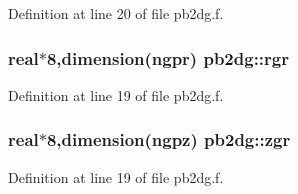 Definition at line 20 of file pb2dg.f.\hypertarget{namespacepb2dg_5018cdbf4ff81bb02ec25414689c7987}{
\subsubsection[rgr]{\setlength{\rightskip}{0pt plus 5cm}real$\ast$8,dimension(ngpr) {\bf pb2dg::rgr}}}
\label{namespacepb2dg_5018cdbf4ff81bb02ec25414689c7987}




Definition at line 19 of file pb2dg.f.\hypertarget{namespacepb2dg_1d7660eee49ff1cdeb8a990886b2bca6}{
\subsubsection[zgr]{\setlength{\rightskip}{0pt plus 5cm}real$\ast$8,dimension(ngpz) {\bf pb2dg::zgr}}}
\label{namespacepb2dg_1d7660eee49ff1cdeb8a990886b2bca6}




Definition at line 19 of file pb2dg.f.